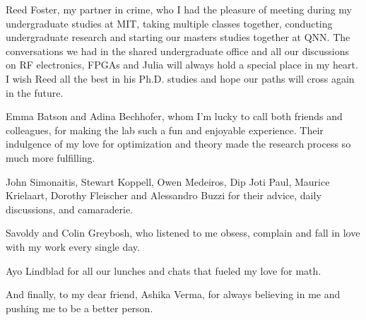 Reed Foster, my partner in crime, who I had the pleasure of meeting during my undergraduate studies at MIT, taking multiple classes together, conducting undergraduate research and starting our masters studies together at QNN. The conversations we had in the shared undergraduate office and all our discussions on RF electronics, FPGAs and Julia will always hold a special place in my heart. I wish Reed all the best in his Ph.D. studies and hope our paths will cross again in the future.

Emma Batson and Adina Bechhofer, whom I’m lucky to call both friends and colleagues, for making the lab such a fun and enjoyable experience. Their indulgence of my love for optimization and theory made the research process so much more fulfilling.

John Simonaitis, Stewart Koppell, Owen Medeiros, Dip Joti Paul, Maurice Krielaart, 
Dorothy Fleischer and Alessandro Buzzi for their advice, daily discussions, and 
camaraderie.

Savoldy and Colin Greybosh, who listened to me obsess, complain and fall in love with my work every single day. 

Ayo Lindblad for all our lunches and chats that fueled my love for math.

And finally, to my dear friend, Ashika Verma, for always believing in me and pushing me to be a better person. 

